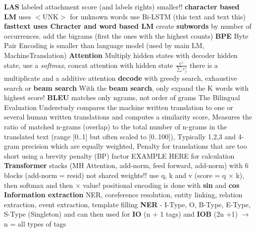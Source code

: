 \documentclass[8pt]{extarticle}
\begin{document}
\begin{multicols*}{3}
\newline \textbf{LAS} labeled attachment score (and labels rights) smaller!!
\newline \textbf{character based LM} uses $<$UNK$>$ for unknown words
\newline use Bi-LSTM (this text and text this)
\newline \textbf{fasttext uses Chracter and word based LM}
\newline create \textbf{subwords} by number of occurrences. add the bigrams (first the ones with the highest counts)
\newline \textbf{BPE} Byte Pair Encoding is smaller than language model (used by main LM, MachineTranslation)
\newline \textbf{Attention} Multiply hidden states with decoder hidden state, use a \textit{softmax}, concat attention with hidden state $\frac{e^{z}}{\sum e^z_j}$
\newline there is a multiplicate and a additive attention
\newline \textbf{decode} with greedy search, exhaustive search or \textbf{beam search}
\newline With the \textbf{beam search}, only expand the K words with highest score!
\newline \textbf{BLEU} matches only ngrams, not order of grams
\newline The Bilingual Evaluation Understudy compares the machine written translation to one or several human written translations and computes a similarity score, Measures the ratio of matched n-grams (overlap) to the total number of n-grams in the translated text (range [0..1] but often scaled to [0..100]), Typically 1,2,3 and 4-gram precision which are equally weighted, Penalty for translations that are too short using a brevity penalty (BP) factor
\newline \colorbox{BurntOrange}{EXAMPLE HERE for calculation}
\newline \textbf{Transformer} stacks (MH Attention, add-norm, feed forward, add-norm) with 6 blocks (add-norm = resid) not shared weights!!
\newline use q, k and v (score = q $\times$ k), then softmax and then $\times$ value!
\newline positional encoding is done with \textbf{sin} and \textbf{cos}
\newline \textbf{Information extraction} NER, coreference resolution, entity linking, relation extraction, event extraction, template filling
\newline \textbf{NER} - I-Type, O, B-Type, E-Type, S-Type (Singleton) and can then used for \textbf{IO} (n + 1 tags) and \textbf{IOB} (2n +1) $\rightarrow$ n = all types of tags

\end{multicols*}
\end{document}

